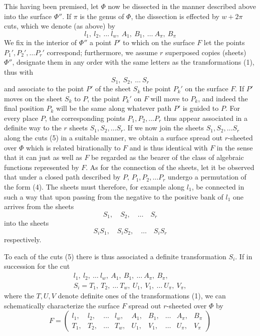 \documentclass{article}
\begin{document}
This having been premised, let $\Phi$ now be dissected in the manner described above into the surface $\Phi''$. If $\pi$ is the genus of $\Phi$, the dissection is effected by $w + 2\pi$ cuts, which we denote (as above) by
\[
l_1, \ l_2, \ \dots \ l_w, \ A_1, \ B_1, \ \dots \ A_\pi, \ B_\pi
\tag{5}
\]
We fix in the interior of $\Phi''$ a point $P'$ to which on the surface $F$ let the points $P_1', P_2', \dots P_r'$ correspond; furthermore, we assume $r$ superposed copies (sheets) $\Phi''$, designate them in any order with the same letters as the transformations (1), thus with
\[
S_1, \ S_2, \ \dots \ S_r
\]
and associate to the point $P'$ of the sheet $S_k$ the point $P_k'$ on the surface $F$. If $P'$ moves on the sheet $S_k$ to $P$, the point $P_k'$ on $F$ will move to $P_k$, and indeed the final position $P_k$ will be the same along whatever path $P'$ is guided to $P$. For every place $P$, the corresponding points $P_1, P_2, \dots P_r$ thus appear associated in a definite way to the $r$ sheets $S_1, S_2, \dots S_r$. If we now join the sheets $S_1, S_2, \dots S_r$ along the cuts (5) in a suitable manner, we obtain a surface spread out $r$-sheeted over $\Phi$ which is related birationally to $F$ and is thus identical with $F$ in the sense that it can just as well as $F$ be regarded as the bearer of the class of algebraic functions represented by $F$. As for the connection of the sheets, let it be observed that under a closed path described by $P$, $P_1, P_2, \dots P_r$ undergo a permutation of the form (4). The sheets must therefore, for example along $l_1$, be connected in such a way that upon passing from the negative to the positive bank of $l_1$ one arrives from the sheets
\[
S_1, \quad S_2, \quad \dots \quad S_r
\]
into the sheets
\[
S_i S_1, \quad S_i S_2, \quad \dots \quad S_i S_r
\]
respectively.

To each of the cuts (5) there is thus associated a definite transformation $S_i$. If in succession for the cut
\[
\begin{gathered}
l_1, \ l_2, \ \dots \ l_w, \ A_1, \ B_1, \ \dots \ A_\pi, \ B_\pi, \\
S_i = T_1, \ T_2, \ \dots \ T_w, \ U_1, \ V_1, \ \dots \ U_\pi, \ V_\pi,
\end{gathered}
\]
where the $T, U, V$ denote definite ones of the transformations (1), we can schematically characterize the surface $F$ spread out $r$-sheeted over $\Phi$ by
\[
F = \begin{pmatrix}
l_1, & l_2, & \dots & l_w, & A_1, & B_1, & \dots & A_\pi, & B_\pi \\
T_1, & T_2, & \dots & T_w, & U_1, & V_1, & \dots & U_\pi, & V_\pi
\end{pmatrix}
\tag{6}
\]
\end{document}
